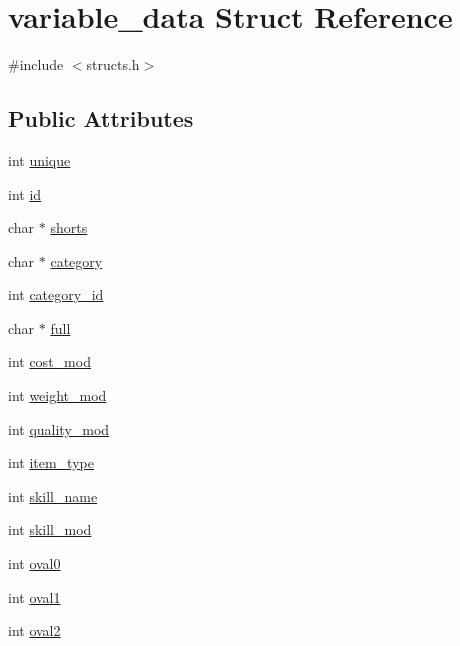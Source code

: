 \hypertarget{structvariable__data}{\section{variable\-\_\-data Struct Reference}
\label{structvariable__data}
}


{\ttfamily \#include $<$structs.\-h$>$}

\subsection*{Public Attributes}
\begin{DoxyCompactItemize}
\item 
int \hyperlink{structvariable__data_af1e6b936a79f29767c0b62cbbacf9edd}{unique}
\item 
int \hyperlink{structvariable__data_a336547d8889d3d3c7a2d8bf044842277}{id}
\item 
char $\ast$ \hyperlink{structvariable__data_aece5a6cc4d302d0e2d5ad87a44b361b9}{shorts}
\item 
char $\ast$ \hyperlink{structvariable__data_a80a0b8817711b353549e57af72de7d33}{category}
\item 
int \hyperlink{structvariable__data_a41c5360735e2d8d2d96d42f51f36b69a}{category\-\_\-id}
\item 
char $\ast$ \hyperlink{structvariable__data_a693c289b0689d96daee190ba499d0ba2}{full}
\item 
int \hyperlink{structvariable__data_a16a698aa7f17efec1278a55da18f80f8}{cost\-\_\-mod}
\item 
int \hyperlink{structvariable__data_ad0f0fa6e7ac8209718c821e5473cc7b9}{weight\-\_\-mod}
\item 
int \hyperlink{structvariable__data_a248d52aab03e7f8147843f1ae1010016}{quality\-\_\-mod}
\item 
int \hyperlink{structvariable__data_a6136f887514ec6b003e2a74442571fe4}{item\-\_\-type}
\item 
int \hyperlink{structvariable__data_af163ab07c1d83fbe7d89d967652424c2}{skill\-\_\-name}
\item 
int \hyperlink{structvariable__data_a508e4c50dfc2879ad76d1873516abc4b}{skill\-\_\-mod}
\item 
int \hyperlink{structvariable__data_ae74f7ca707a04fc37b216bfcbda0d89d}{oval0}
\item 
int \hyperlink{structvariable__data_a2c02fd8cd657583a3a630ae1caa439a6}{oval1}
\item 
int \hyperlink{structvariable__data_a6a39fc4450f8f6be1b108185af6ecb5e}{oval2}

\end{DoxyCompactItemize}
